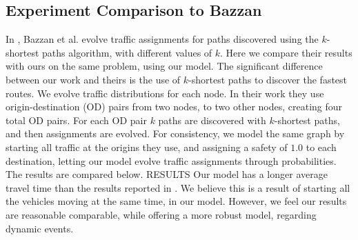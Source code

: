 \subsection{Experiment Comparison to Bazzan}
In \cite{bazzan2014evolutionary}, Bazzan et al. evolve traffic
assignments for paths discovered using the $k$-shortest paths
algorithm, with different values of $k$. Here we compare their results
with ours on the same problem, using our model. The significant
difference between our work and theirs is the use of $k$-shortest
paths to discover the fastest routes. We evolve traffic distributions
for each node. In their work they use origin-destination (OD) pairs from
two nodes, to two other nodes, creating four total OD pairs. For each OD
pair $k$ paths are discovered with $k$-shortest paths, and then assignments
are evolved. For consistency, we model the same graph by starting all
traffic at the origins they use, and assigning a safety of $1.0$ to each
destination, letting our model evolve traffic assignments through probabilities.
The results are compared below.
RESULTS
Our model has a longer average travel time than the results reported in
\cite{bazzan2014evolutionary}. We believe this is a result of starting
all the vehicles moving at the same time, in our model. However, we feel
our results are reasonable comparable, while offering a more robust model,
regarding dynamic events.


